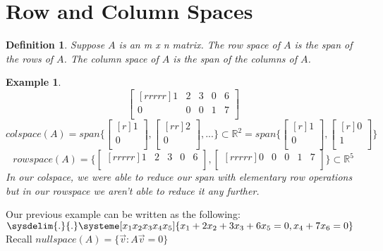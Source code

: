 \documentclass{report}
\newtheorem*{ex}{Example}
\newtheorem*{defn}{Definition}
\begin{document}
\section{Row and Column Spaces}
\begin{defn}
Suppose $A$ is an m x n matrix. The row space of $A$ is the span of the rows of $A$. The column space of $A$ is the span of the columns of $A$.
\end{defn}
\begin{ex}
\[ \begin{bmatrix}[rrrrr] 1 & 2 & 3 & 0 & 6\\ 0 & 0 & 0 & 1 & 7\\ \end{bmatrix} \]
\[ colspace(A) = span\{\begin{bmatrix}[r]1\\0\\ \end{bmatrix}, \begin{bmatrix}[rr]2\\0\\ \end{bmatrix}, ...\} \subset \mathbb{R}^2 = span\{\begin{bmatrix}[r]1\\0\\ \end{bmatrix}, \begin{bmatrix}[r]0\\1\\ \end{bmatrix} \} \]
\[ rowspace(A) = \{\begin{bmatrix}[rrrrr]1&2&3&0&6\\ \end{bmatrix},\begin{bmatrix}[rrrrr]0&0&0&1&7\\ \end{bmatrix}\} \subset \mathbb{R}^5 \]
In our colspace, we were able to reduce our span with elementary row operations but in our rowspace we aren't able to reduce it any further.
\end{ex}
Our previous example can be written as the following: $\sysdelim{.}{.}\systeme[x_1x_2x_3x_4x_5]{x_1+2x_2+3x_3+6x_5=0,x_4+7x_6=0}$\\
Recall $nullspace(A)=\{\vec{v}: A\vec{v} = 0\}$\\
\end{document}

